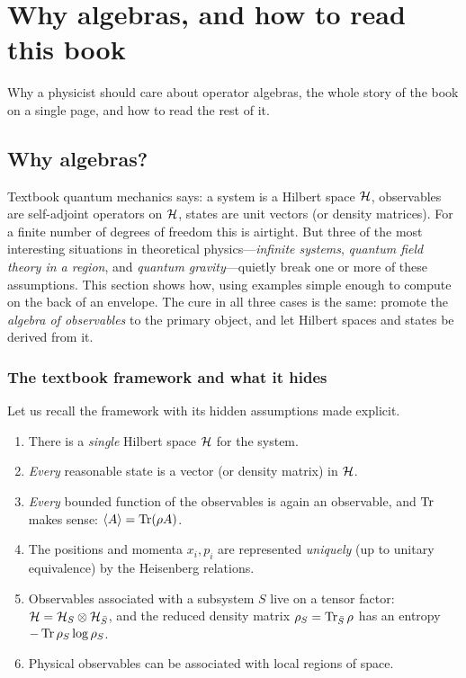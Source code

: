 \chapter{Why algebras, and how to read this book}\label{ch:intro}

Why a physicist should care about operator algebras, the whole story of the book on a single page, and how to read the rest of it.

\section{Why algebras?}\label{ch:why_algebras}

\begin{physmotiv}
Textbook quantum mechanics says: a system is a Hilbert space $\mathcal{H}$, observables are self-adjoint operators on $\mathcal{H}$, states are unit vectors (or density matrices). For a finite number of degrees of freedom this is airtight. But three of the most interesting situations in theoretical physics---\emph{infinite systems}, \emph{quantum field theory in a region}, and \emph{quantum gravity}---quietly break one or more of these assumptions. This section shows how, using examples simple enough to compute on the back of an envelope. The cure in all three cases is the same: promote the \emph{algebra of observables} to the primary object, and let Hilbert spaces and states be derived from it.
\end{physmotiv}

\subsection{The textbook framework and what it hides}

Let us recall the framework with its hidden assumptions made explicit.

\begin{enumerate}[label=(\roman*)]
\item There is a \emph{single} Hilbert space $\mathcal{H}$ for the system.
\item \emph{Every} reasonable state is a vector (or density matrix) in $\mathcal{H}$.
\item \emph{Every} bounded function of the observables is again an observable, and $\operatorname{Tr}$ makes sense: $\langle A\rangle=\operatorname{Tr}(\rho A)$.
\item The positions and momenta $x_i,p_i$ are represented \emph{uniquely} (up to unitary equivalence) by the Heisenberg relations.
\item Observables associated with a subsystem $S$ live on a tensor factor: $\mathcal{H}=\mathcal{H}_S\otimes\mathcal{H}_{\bar S}$, and the reduced density matrix $\rho_S=\operatorname{Tr}_{\bar S}\rho$ has an entropy $-\operatorname{Tr}\rho_S\log\rho_S$.
\item Physical observables can be associated with local regions of space.
\end{enumerate}

